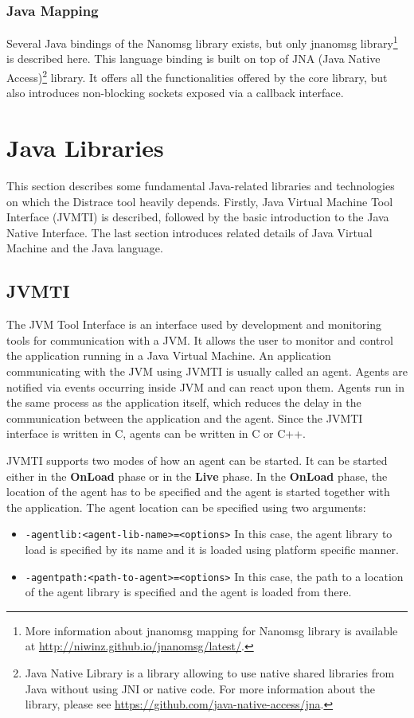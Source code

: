\subsubsection{Java Mapping}
Several Java bindings of the Nanomsg library exists, but only jnanomsg library\footnote{More information about jnanomsg mapping for Nanomsg library is available at \url{http://niwinz.github.io/jnanomsg/latest/}.}  is described here. This language binding is built on top of JNA (Java Native Access)\footnote{Java Native Library is a library allowing to use native shared libraries from Java without using JNI or native code. For more information about the library, please see \url{https://github.com/java-native-access/jna}.} library. It offers all the functionalities offered by the core library, but also introduces non-blocking sockets exposed via a callback interface.

\section{Java Libraries}
This section describes some fundamental Java-related libraries and technologies on which the Distrace tool heavily depends. Firstly, Java Virtual Machine Tool Interface (JVMTI) is described, followed by the basic introduction to the Java Native Interface. The last section introduces related details of Java Virtual Machine and the Java language.
\subsection{JVMTI}
\label{JVMTI}
The JVM Tool Interface is an interface used by development and monitoring tools for communication with a JVM. It allows the user to monitor and control the application running in a Java Virtual Machine. An application communicating with the JVM using JVMTI is usually called an agent. Agents are notified via events occurring inside JVM and can react upon them. Agents run in the same process as the application itself, which reduces the delay in the communication between the application and the agent. Since the JVMTI interface is written in C, agents can be written in C or C++. 

JVMTI supports two modes of how an agent can be started. It can be started either in the \textbf{OnLoad} phase or in the \textbf{Live} phase. In the \textbf{OnLoad} phase, the location of the agent has to be specified and the agent is started together with the application. The agent location can be specified using two arguments:
\begin{itemize}
	\item \texttt{-agentlib:<agent-lib-name>=<options>} \newline
	In this case, the agent library to load is specified by its name and it is loaded using platform specific manner.
	\item \texttt{-agentpath:<path-to-agent>=<options>} \newline
	In this case, the path to a location of the agent library is specified and the agent is loaded from there.
\end{itemize}

